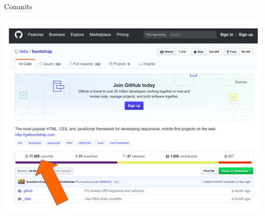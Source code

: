 \documentclass{beamer}
\begin{document}
\begin{frame}{Commits}
  \begin{center}
       
\includegraphics[height=0.7\paperheight]{fig/aula3/commits_projeto.png} \\
      \end{center}
 
\end{frame}
\end{document}
